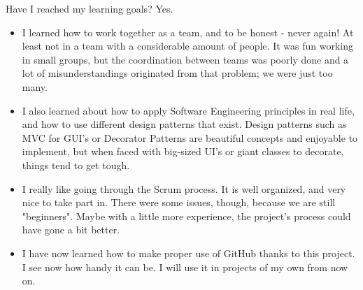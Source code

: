 \documentclass{article}
\begin{document}
\begin{enumerate}
\begin{itemize}
Have I reached my learning goals? Yes. 
\begin{itemize}
    \item I learned how to work together as a team, and to be honest - never again! At least not in a team with a considerable amount of people. It was fun working in small groups, but the coordination between teams was poorly done and a lot of misunderstandings originated from that problem; we were just too many. 
    \item I also learned about how to apply Software Engineering principles in real life, and how to use different design patterns that exist. Design patterns such as MVC for GUI's or Decorator Patterns are beautiful concepts and enjoyable to implement, but when faced with big-sized UI's or giant classes to decorate, things tend to get tough. 
    \item I really like going through the Scrum process. It is well organized, and very nice to take part in. There were some issues, though, because we are still "beginners". Maybe with a little more experience, the project's process could have gone a bit better.
    \item I have now learned how to make proper use of GitHub thanks to this project. I see now how handy it can be. I will use it in projects of my own from now on. 
\end{itemize}


\end{itemize}
\end{enumerate}
\end{document}
